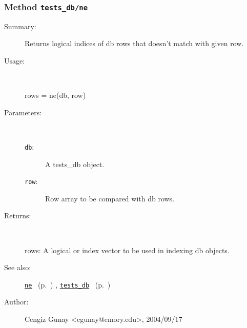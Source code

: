 \subsubsection[Method \texttt{ne}]{Method \texttt{tests\_db/ne}}%
%
\label{ref_tests_db__ne}%
\hypertarget{ref_tests_db__ne}{}%
\begin{description}
\item[Summary:]Returns logical indices of db rows that doesn't match with given row.
%
\item[Usage:]~%
\begin{lyxcode}%
rows = ne(db, row)
%
\end{lyxcode}%
%
%
\item[Parameters:]~
\begin{description}%
\item[\texttt{db}:]
 A tests\_db object.
\item[\texttt{row}:]
 Row array to be compared with db rows.
\end{description}%
%
\item[Returns:]~

	rows: A logical or index vector to be used in indexing db objects. 
%
%
\item[See also:]%
\hyperlink{ref_ne}{\texttt{ne}}%
\ (p.~\pageref{ref_ne})%
%
, \hyperlink{ref_tests_db}{\texttt{tests\_db}}%
\ (p.~\pageref{ref_tests_db})%
%
%
\item[Author:]%
Cengiz Gunay <cgunay@emory.edu>, 2004/09/17%
\end{description}
\methodline%
